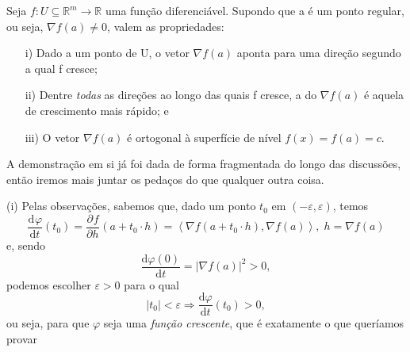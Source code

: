 \documentclass[../analysisII_notes.tex]{subfiles}
\begin{document}
\begin{prop*}[Propriedades]
	Seja \(f:U\subseteq \mathbb{R}^{m}\rightarrow \mathbb{R}\) uma função diferenciável. Supondo que a é um ponto regular, ou seja, \(\nabla f(a)\neq 0\), valem as propriedades:
	\begin{itemize}
		\item[i)] Dado a um ponto de U, o vetor \(\nabla f(a)\) aponta para uma direção segundo a qual f cresce;
		\item[ii)] Dentre \textit{todas} as direções ao longo das quais f cresce, a do \(\nabla f(a)\) é aquela de crescimento mais rápido; e
		\item[iii)] O vetor \(\nabla f(a)\) é ortogonal à superfície de nível \(f(x) = f(a) = c.\)
	\end{itemize}
\end{prop*}
\begin{proof*}
	A demonstração em si já foi dada de forma fragmentada do longo das discussões, então iremos mais juntar os pedaços do que qualquer outra coisa.

	(i) Pelas observações, sabemos que, dado um ponto \(t_{0}\) em \((-\varepsilon , \varepsilon )\), temos
	\[
		\frac{\mathrm{d}^{}\varphi }{\mathrm{d} t^{}}(t_{0}) = \frac{\partial^{}f}{\partial h^{}} (a+t_{0}\cdot h) = \left< \nabla f(a+t_{0}\cdot h), \nabla f(a) \right>,\; h = \nabla f(a)
	\]
	e, sendo
	\[
		\frac{\mathrm{d}\varphi (0)}{\mathrm{d}t} = |\nabla f(a)|^{2} > 0,
	\]
	podemos escolher \(\varepsilon  > 0\) para o qual
	\[
		|t_{0}| < \varepsilon  \Rightarrow \frac{\mathrm{d}\varphi }{\mathrm{d}t}(t_{0}) > 0,
	\]
	ou seja, para que \(\varphi \) seja uma \textit{função crescente}, que é exatamente o que queríamos provar


\end{proof*}
\end{document}
